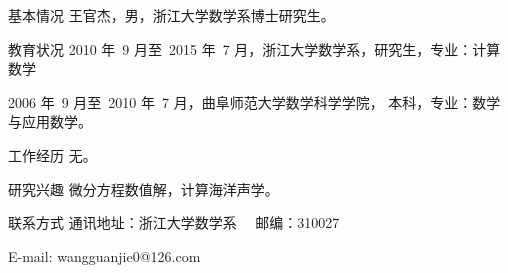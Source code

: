 
\begin{resume}

\begin{resumesection}{基本情况}
王官杰，男，浙江大学数学系博士研究生。
\end{resumesection}

\begin{resumelist}{教育状况}
2010 年~9 月至~2015 年~7
月，浙江大学数学系，研究生，专业：计算数学
 
2006 年~9 月至~2010 年~7 月，曲阜师范大学数学科学学院，
本科，专业：数学与应用数学。
\end{resumelist}

\begin{resumelist}{工作经历}
无。
\end{resumelist}

\begin{resumelist}{研究兴趣}
微分方程数值解，计算海洋声学。
\end{resumelist}

\begin{resumelist}{联系方式}
通讯地址：浙江大学数学系 \ \ 邮编：310027

E-mail: wangguanjie0@126.com
\end{resumelist}

\end{resume}